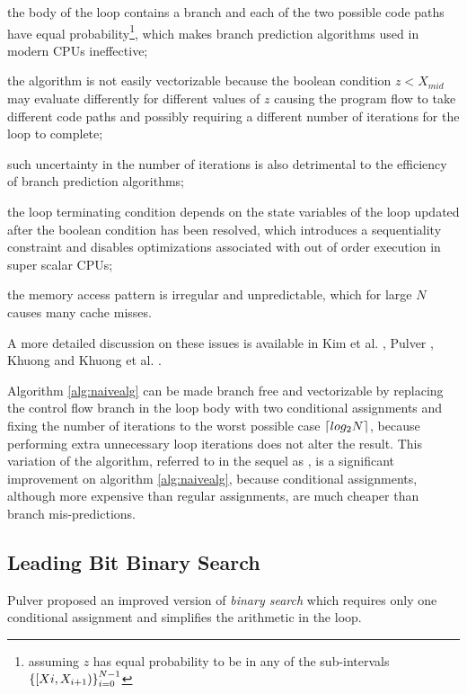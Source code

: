 \documentclass[preprint,1p,times]{elsarticle}
\begin{document}
\begin{myitemize}
	\item the body of the loop contains a branch and each of the two possible code paths have equal probability\footnote{assuming $z$ has equal probability to be in any of the sub-intervals $\left \{ [X{i},X_{i+1}) \right \}_{i=0}^{N-1}$}, which makes branch prediction algorithms used in modern CPUs ineffective; 
	\item the algorithm is not easily vectorizable because the boolean condition $z<X_{mid}$ may evaluate differently for different values of $z$ causing the program flow to take different code paths and possibly requiring a different number of iterations for the loop to complete;
	\item such uncertainty in the number of iterations is also detrimental to the efficiency of branch prediction algorithms;
    \item the loop terminating condition depends on the state variables of the loop updated after the boolean condition has been resolved, which introduces a sequentiality constraint and disables optimizations associated with out of order execution in super scalar CPUs;
    \item the memory access pattern is irregular and unpredictable, which for large $N$ causes many cache misses.
\end{myitemize}
A more detailed discussion on these issues is available in Kim et al. \cite{Kim2011}, Pulver \cite{Pulver2011}, Khuong \cite{Khuong2012} and Khuong et al. \cite{Morin2015}.

Algorithm \ref{alg:naivealg} can be made branch free and vectorizable by replacing the control flow branch in the loop body with two conditional assignments and fixing the number of iterations to the worst possible case $\left \lceil log_2N \right \rceil$, because performing extra unnecessary loop iterations does not alter the result. 
This variation of the algorithm, referred to in the sequel as \textit{\ClassicModName}, is a significant improvement on algorithm \ref{alg:naivealg}, because conditional assignments, although more expensive than regular assignments, are much cheaper than branch mis-predictions.

\subsection{Leading Bit Binary Search}
\label{sec:optimbinary}

Pulver \cite{Pulver2011} proposed an improved version of \textit{binary search} which requires only one conditional assignment and simplifies the arithmetic in the loop.
\end{document}
